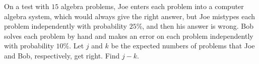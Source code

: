 On a test with $15$ algebra problems, Joe enters each problem into a computer algebra system, which would always give the right answer, but Joe mistypes each problem independently with probability $25\%$, and then his answer is wrong. Bob solves each problem by hand and makes an error on each problem independently with probability $10\%$. Let $j$ and $k$ be the expected numbers of problems that Joe and Bob, respectively, get right. Find $j-k$.
